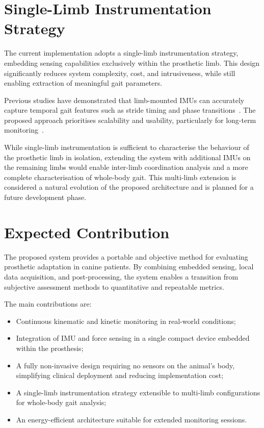 \section{Single-Limb Instrumentation Strategy}

The current implementation adopts a single-limb instrumentation strategy,
embedding sensing capabilities exclusively within the prosthetic limb.
This design significantly reduces system complexity, cost, and intrusiveness,
while still enabling extraction of meaningful gait parameters.

Previous studies have demonstrated that limb-mounted IMUs can accurately
capture temporal gait features such as stride timing and phase
transitions~\cite{Jenkins2018,Trojaniello2014}.
The proposed approach prioritises scalability and usability, particularly for
long-term monitoring~\cite{Zhang2022}.

While single-limb instrumentation is sufficient to characterise the behaviour
of the prosthetic limb in isolation, extending the system with additional IMUs
on the remaining limbs would enable inter-limb coordination analysis and a more
complete characterisation of whole-body gait.
This multi-limb extension is considered a natural evolution of the proposed
architecture and is planned for a future development phase.

\section{Expected Contribution}

The proposed system provides a portable and objective method for evaluating
prosthetic adaptation in canine patients.
By combining embedded sensing, local data acquisition, and post-processing,
the system enables a transition from subjective assessment methods to
quantitative and repeatable metrics.

The main contributions are:
\begin{itemize}
  \item Continuous kinematic and kinetic monitoring in real-world conditions;
  \item Integration of IMU and force sensing in a single compact device
        embedded within the prosthesis;
  \item A fully non-invasive design requiring no sensors on the animal's body,
        simplifying clinical deployment and reducing implementation cost;
  \item A single-limb instrumentation strategy extensible to multi-limb
        configurations for whole-body gait analysis;
  \item An energy-efficient architecture suitable for extended monitoring sessions.
\end{itemize}
